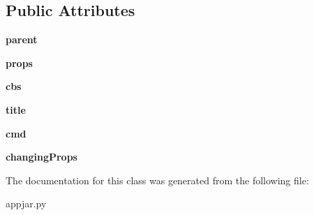 \subsection*{Public Attributes}
\begin{DoxyCompactItemize}
\item 
\mbox{\label{class_python_01_g_u_i_1_1appjar_1_1_properties_adbbf78dfc65ea1c658f3ee863833b584}} 
{\bfseries parent}
\item 
\mbox{\label{class_python_01_g_u_i_1_1appjar_1_1_properties_a6d45c1b8c5aa17fad7f4f57b42cbcb11}} 
{\bfseries props}
\item 
\mbox{\label{class_python_01_g_u_i_1_1appjar_1_1_properties_a56b74472f4473c800b9a465796fd8a74}} 
{\bfseries cbs}
\item 
\mbox{\label{class_python_01_g_u_i_1_1appjar_1_1_properties_ae3b654dc58b8e2a9a9bf005fbcf24990}} 
{\bfseries title}
\item 
\mbox{\label{class_python_01_g_u_i_1_1appjar_1_1_properties_a3049dd3809cbf89281f74e034bd1eb9d}} 
{\bfseries cmd}
\item 
\mbox{\label{class_python_01_g_u_i_1_1appjar_1_1_properties_a07fc1713c83b04eeda425577015280dc}} 
{\bfseries changing\+Props}
\end{DoxyCompactItemize}


The documentation for this class was generated from the following file\+:\begin{DoxyCompactItemize}
\item 
appjar.\+py\end{DoxyCompactItemize}
